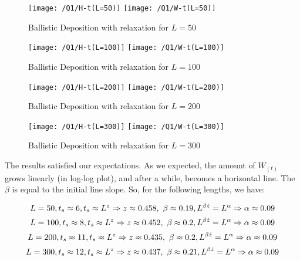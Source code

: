 \documentclass{article}
\begin{document}
    \begin{figure}[!htb]
        \centering
        \texttt{[image: /Q1/H-t(L=50)]}
        \label{fig:1.2}
        \texttt{[image: /Q1/W-t(L=50)]}
        \label{fig:1.3}
        \caption{Ballistic Deposition with relaxation for $L=50$}
    \end{figure}
    \begin{figure}[!htb]
        \centering
        \texttt{[image: /Q1/H-t(L=100)]}
        \label{fig:1.4}
        \texttt{[image: /Q1/W-t(L=100)]}
        \label{fig:1.5}
        \caption{Ballistic Deposition with relaxation for $L=100$}
    \end{figure}
    \begin{figure}[!htb]
        \centering
        \texttt{[image: /Q1/H-t(L=200)]}
        \label{fig:1.6}
        \texttt{[image: /Q1/W-t(L=200)]}
        \label{fig:1.7}
        \caption{Ballistic Deposition with relaxation for $L=200$}
    \end{figure}
    \pagebreak
    \begin{figure}[!htb]
        \centering
        \texttt{[image: /Q1/H-t(L=300)]}
        \label{fig:1.8}
        \texttt{[image: /Q1/W-t(L=300)]}
        \label{fig:1.9}
        \caption{Ballistic Deposition with relaxation for $L=300$}
    \end{figure}

    The results satisfied our expectations.
    As we expected, the amount of $W_{(t)}$ grows linearly (in log-log plot),
    and after a while, becomes a horizontal line.
    The $\beta$ is equal to the initial line slope.
    So, for the following lengths, we have:

    \begin{equation}
        \centering
        L = 50, t_{s} \approx 6, t_{s} \approx L^z \Rightarrow z \approx 0.458,\
        \beta \approx 0.19, L^{\beta \dot z} = L^{\alpha} \Rightarrow \alpha \approx 0.09
    \end{equation}
    \begin{equation}
        \centering
        L = 100, t_{s} \approx 8, t_{s} \approx L^z \Rightarrow z \approx 0.452,\
        \beta \approx 0.2, L^{\beta \dot z} = L^{\alpha} \Rightarrow \alpha \approx 0.09
    \end{equation}
    \begin{equation}
        \centering
        L = 200, t_{s} \approx 11, t_{s} \approx L^z \Rightarrow z \approx 0.435,\
        \beta \approx 0.2, L^{\beta \dot z} = L^{\alpha} \Rightarrow \alpha \approx 0.09
    \end{equation}
    \begin{equation}
        \centering
        L = 300, t_{s} \approx 12, t_{s} \approx L^z \Rightarrow z \approx 0.437,\
        \beta \approx 0.21, L^{\beta \dot z} = L^{\alpha} \Rightarrow \alpha \approx 0.09
    \end{equation}
\end{document}
